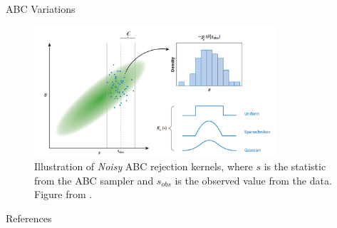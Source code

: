 \documentclass[10pt]{beamer}
\begin{document}
\begin{frame}[fragile]{ABC Variations}

    \begin{figure}[H]
        \centering
        \includegraphics[width=9cm]{images/NoisyABC.png}
        \caption{
        Illustration of \textit{Noisy} ABC rejection kernels, where
        $s$ is the statistic from the ABC sampler and $s_{obs}$ is 
        the observed value from the data.
        Figure from \cite{Beaumont2018}.
        }
    \end{figure}

\end{frame}

\begin{frame}[allowframebreaks]{References}

  \renewcommand{\section}[2]{}%
  
  

\end{frame}
\end{document}
